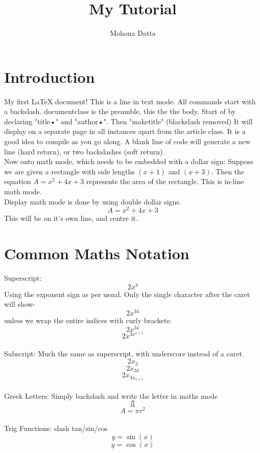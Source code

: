 \documentclass[11pt]{report}
\begin{document}
\title{My Tutorial}
\author{Mohona Datta}
\maketitle
\tableofcontents
\chapter{Introduction}
My first LaTeX document!
This is a line in text mode. 
All commands start with a backslash.
documentclass is the preamble, this the the body. 
Start of by declaring "title{•}" and "author{•}". Then "maketitle" (blackslash removed) It will display on a separate page in all instances apart from the article class. 
It is a good idea to compile as you go along.
A blank line of code will generate a new line (hard return), or two backslashes (soft return).\\
Now onto math mode, which needs to be embedded with a dollar sign:
Suppose we are given a rectangle with side lengths $(x+1)$ and $(x+3)$. Then the equation $A=x^2+4x+3$ represents the area of the rectangle. This is in-line math mode.\\
Display math mode is done by using double dollar signs.
$$A=x^2+4x+3$$
This will be on it's own line, and centre it.
\chapter{Common Maths Notation}
Superscript: 
$$2x^3$$ Using the exponent sign as per usual. Only the single character after the caret will show- $$2x^34$$ unless we wrap the entire indices with curly brackets: $$2x^{34}$$
$$2x^{3x^{4+5}}$$
\\Subscript:
Much the same as superscript, with underscore instead of a caret.
$$2x_3$$
$$2x_{34}$$
$$2x_{3x_{4+5}}$$
\\Greek Letters: Simply backslash and write the letter in maths mode
$$\pi$$
$$\alpha$$
$$A=\pi r^2$$
\\Trig Functions: slash tan/sin/cos
$$y=\sin(x)$$
$$y=\cos(x)$$
\end{document}
